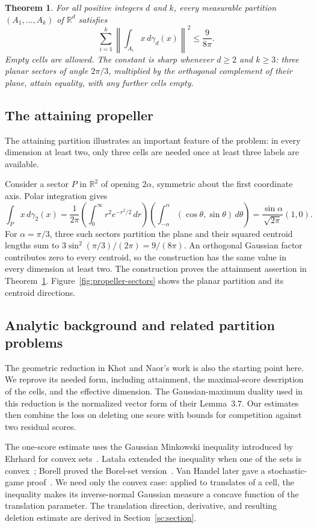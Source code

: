 \documentclass[11pt]{article}
\numberwithin{equation}{section}
\newtheorem{theorem}{Theorem}[section]
\theoremstyle{definition}
\theoremstyle{remark}
\begin{document}
\begin{theorem}\label{thm:main}
For all positive integers $d$ and $k$, every measurable partition
$(A_1,\ldots,A_k)$ of $\mathbb R^d$ satisfies
\[
 \sum_{i=1}^k\left\|\int_{A_i}x\,d\gamma_d(x)\right\|^2
 \le\frac9{8\pi}.
\]
Empty cells are allowed. The constant is sharp whenever $d\ge2$ and
$k\ge3$: three planar sectors of angle $2\pi/3$, multiplied by the
orthogonal complement of their plane, attain equality, with any further
cells empty.
\end{theorem}

\subsection{The attaining propeller}
\label{sec:example}
The attaining partition illustrates an important feature of the
problem: in every dimension at least two, only three cells are needed
once at least three labels are available.

Consider a sector $P$ in $\mathbb R^2$ of opening
$2\alpha$, symmetric about the first coordinate axis. Polar integration
gives
\[
 \int_P x\,d\gamma_2(x)
 =\frac1{2\pi}\left(\int_0^\infty r^2e^{-r^2/2}\,dr\right)
      \left(\int_{-\alpha}^{\alpha}(\cos\theta,\sin\theta)\,d\theta\right)
 =\frac{\sin\alpha}{\sqrt{2\pi}}(1,0).
\]
For $\alpha=\pi/3$, three such sectors partition the plane and their
squared centroid lengths sum to
$3\sin^2(\pi/3)/(2\pi)=9/(8\pi)$.
An orthogonal Gaussian factor contributes zero to every centroid, so
the construction has the same value in every dimension at least two.
The construction proves the attainment assertion in
Theorem~\ref{thm:main}.
Figure~\ref{fig:propeller-sectors} shows the planar partition and its
centroid directions.



\subsection{Analytic background and related partition problems}
The geometric reduction in Khot and Naor's work is also the starting
point here. We reprove its needed form, including attainment, the
maximal-score description of the cells, and the effective dimension.
The Gaussian-maximum duality used in this reduction is the normalized
vector form of their Lemma~3.7. Our estimates then combine the loss on deleting
one score with bounds for competition against two residual scores.

The one-score estimate uses the Gaussian Minkowski inequality introduced
by Ehrhard for convex sets~\cite{Ehrhard}. Lata\l a extended the
inequality when one of the sets is convex~\cite{Latala}; Borell proved
the Borel-set version~\cite[Theorem~1.1]{Borell}. Van Handel later gave
a stochastic-game proof~\cite{vanHandel}. We need only the convex case:
applied to translates of a cell, the inequality makes its inverse-normal
Gaussian measure a concave function of the translation parameter. The
translation direction, derivative, and resulting deletion estimate are
derived in Section~\ref{sc:section}.
\end{document}
